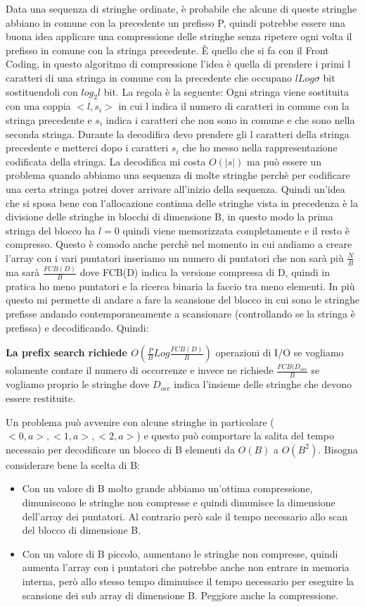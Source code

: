 \documentclass[14pt]{extreport}
\begin{document}
Data una sequenza di stringhe ordinate, è probabile che alcune di queste stringhe abbiano in comune con la precedente un prefisso P, quindi potrebbe essere una buona idea applicare una compressione delle stringhe senza ripetere ogni volta il prefisso in comune con la stringa precedente.
È quello che si fa con il Front Coding, in questo algoritmo di compressione l'idea è quella di prendere i primi l caratteri di una stringa in comune con la precedente che occupano $lLog\sigma$ bit sostituendoli con $log_2 l$ bit.
La regola è la seguente:
Ogni stringa viene sostituita con una coppia $<l,s_i>$ in cui l indica il numero di caratteri in comune con la stringa precedente e $s_i$ indica i caratteri che non sono in comune e che sono nella seconda stringa. Durante la decodifica devo prendere gli l caratteri della stringa precedente e metterci dopo i caratteri $s_i$ che ho messo nella rappresentazione codificata della stringa. La decodifica mi costa $O(|s|)$ ma può essere un problema quando abbiamo una sequenza di molte stringhe perchè per codificare una certa stringa potrei dover arrivare all'inizio della sequenza.
Quindi un'idea che si sposa bene con l'allocazione continua delle stringhe vista in precedenza è la divisione delle stringhe in blocchi di dimensione B, in questo modo la prima stringa del blocco ha $l=0$ quindi viene memorizzata completamente e il resto è compresso.
Questo è comodo anche perchè nel momento in cui andiamo a creare l'array con i vari puntatori inseriamo un numero di puntatori che non sarà più $\frac{N}{B}$ ma sarà $\frac{FCB(D)}{B}$ dove FCB(D) indica la versione compressa di D, quindi in pratica ho meno puntatori e la ricerca binaria la faccio tra meno elementi.
In più questo mi permette di andare a fare la scansione del blocco in cui sono le stringhe prefisse andando contemporaneamente a scansionare (controllando se la stringa è prefissa) e decodificando.
Quindi:

\textbf{La prefix search richiede $O(\frac{P}{B}Log\frac{FCB(D)}{B})$} operazioni di I/O se vogliamo solamente contare il numero di occorrenze e invece ne richiede $\frac{FCB(D_{occ}}{B}$ se vogliamo proprio le stringhe dove $D_{occ}$ indica l'insieme delle stringhe che devono essere restituite.

Un problema può avvenire con alcune stringhe in particolare ($<0,a>,<1,a>,<2,a>$) e questo può comportare la salita del tempo necessaio per decodificare un blocco di B elementi da $O(B)$ a $O(B^2)$. 
Bisogna considerare bene la scelta di B:
\begin{itemize}
\item Con un valore di B molto grande abbiamo un'ottima compressione, dimuniscono le stringhe non compresse e quindi dimunisce la dimensione dell'array dei puntatori. Al contrario però sale il tempo necessario allo scan del blocco di dimensione B.
\item Con un valore di B piccolo, aumentano le stringhe non compresse, quindi aumenta l'array con i puntatori che potrebbe anche non entrare in memoria interna, però allo stesso tempo diminuisce il tempo necessario per eseguire la scansione dei sub array di dimensione B. Peggiore anche la compressione.
\end{itemize}
\end{document}
